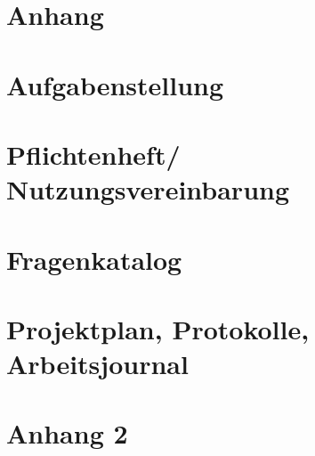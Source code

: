 \section*{Anhang}
\appendix
\startcontents[sections]
\clearpage
\pagebreak

\section{Aufgabenstellung}
\section{Pflichtenheft/ Nutzungsvereinbarung}
\section{Fragenkatalog}
\section{Projektplan, Protokolle, Arbeitsjournal}


%

\section{Anhang 2}